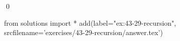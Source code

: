 
\begin{ex}
  \label{ex:43-29-recursion}
  
  \qed
\end{ex}
\begin{python0}
from solutions import *
add(label="ex:43-29-recursion",
    srcfilename='exercises/43-29-recursion/answer.tex')
\end{python0}

